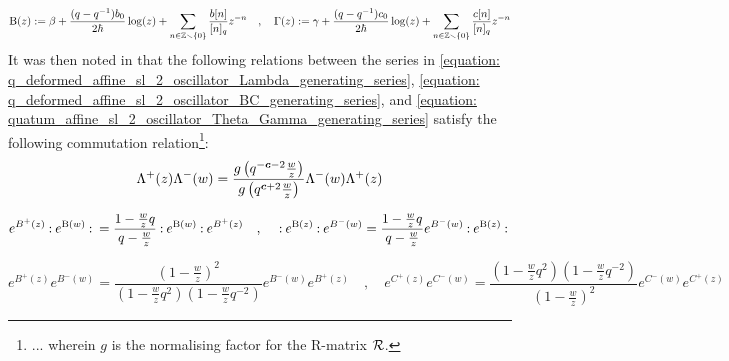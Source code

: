                 \begin{equation} \label{equation: quatum_affine_sl_2_oscillator_Theta_Gamma_generating_series}
                    \mathrm{B}(z) := \beta + \frac{(q - q^{-1}) b_0}{2\hbar} \log(z) + \sum_{n \in \mathbb{Z} \smallsetminus \{0\}} \frac{b[n]}{[n]_q} z^{-n}
                    \quad, \quad
                    \Gamma(z) := \gamma + \frac{(q - q^{-1}) c_0}{2\hbar} \log(z) + \sum_{n \in \mathbb{Z} \smallsetminus \{0\}} \frac{c[n]}{[n]_q} z^{-n}
                \end{equation}
            It was then noted in \cite{frenkel_reshetikhin_affine_QUEs_and_deformed_virasoro_and_finite_W_algebras} that the following relations between the series in \eqref{equation: q_deformed_affine_sl_2_oscillator_Lambda_generating_series}, \eqref{equation: q_deformed_affine_sl_2_oscillator_BC_generating_series}, and \eqref{equation: quatum_affine_sl_2_oscillator_Theta_Gamma_generating_series} satisfy the following commutation relation\footnote{... wherein $g$ is the normalising factor for the R-matrix $\mathcal{R}$.}:
                \begin{equation} \label{equation: q_deformed_affine_sl_2_oscillator_Lambda_generating_series_commutators}
                    \Lambda^+(z) \Lambda^-(w) = \frac{ g\left( q^{-\boldsymbol{c} - 2} \frac{w}{z} \right) }{ g\left( q^{\boldsymbol{c} + 2} \frac{w}{z} \right) } \Lambda^-(w) \Lambda^+(z)
                \end{equation}
                
                \begin{equation} \label{equation: q_deformed_affine_sl_2_oscillator_BC_generating_series_commutators}
                    e^{ B^+(z) } \: \mathbf{:} \: { e^{\mathrm{B}(w)} }  \: \mathbf{:} \: = \frac{ 1 - \frac{w}{z} q }{ q - \frac{w}{z} } \: \mathbf{:} \: { e^{\mathrm{B}(w)} }  \: \mathbf{:} \: e^{ B^+(z) }
                    \quad, \quad
                    \: \mathbf{:} \: { e^{ \mathrm{B}(z) } }  \: \mathbf{:} \: e^{ B^-(w) } = \frac{ 1 - \frac{w}{z} q }{ q - \frac{w}{z} } e^{B^-(w)} \: \mathbf{:} \: { e^{ \mathrm{B}(z) } }  \: \mathbf{:} \:
                \end{equation}
                
                \begin{equation} \label{equation: quatum_affine_sl_2_oscillator_Theta_Gamma_generating_series_commutators}
                    e^{B^+(z)} e^{B^-(w)} = \frac{ \left(1 - \frac{w}{z}\right)^2 }{ \left( 1 - \frac{w}{z} q^2 \right) \left( 1 - \frac{w}{z} q^{-2} \right) } e^{B^-(w)} e^{B^+(z)}
                    \quad, \quad
                    e^{C^+(z)} e^{C^-(w)} = \frac{ \left( 1 - \frac{w}{z} q^2 \right) \left( 1 - \frac{w}{z} q^{-2} \right) }{ \left(1 - \frac{w}{z}\right)^2 } e^{C^-(w)} e^{C^+(z)}
                \end{equation}

